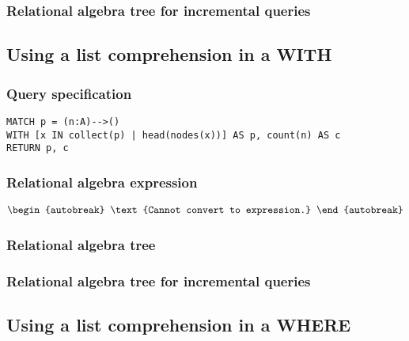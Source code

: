 
\subsubsection*{Relational algebra tree for incremental queries}


\subsection{Using a list comprehension in a WITH}

\subsubsection*{Query specification}

\begin{lstlisting}
MATCH p = (n:A)-->()
WITH [x IN collect(p) | head(nodes(x))] AS p, count(n) AS c
RETURN p, c
\end{lstlisting}

\subsubsection*{Relational algebra expression}

\begin{align*}
\begin{autobreak}
\text{Cannot convert to expression.}
\end{autobreak}
\end{align*}

\subsubsection*{Relational algebra tree}


\subsubsection*{Relational algebra tree for incremental queries}


\subsection{Using a list comprehension in a WHERE}

